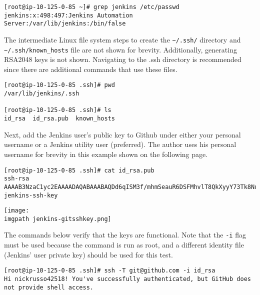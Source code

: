 \begin{verbatim}
[root@ip-10-125-0-85 ~]# grep jenkins /etc/passwd
jenkins:x:498:497:Jenkins Automation Server:/var/lib/jenkins:/bin/false
\end{verbatim}

The intermediate Linux file system steps to create the \verb|~/.ssh/|
directory and \verb|~/.ssh/known_hosts| file are not shown for brevity.
Additionally, generating RSA2048 keys is not shown.  Navigating to the .ssh
directory is recommended since there are additional commands that use these files.

\begin{verbatim}
[root@ip-10-125-0-85 .ssh]# pwd
/var/lib/jenkins/.ssh

[root@ip-10-125-0-85 .ssh]# ls
id_rsa  id_rsa.pub  known_hosts
\end{verbatim}

Next, add the Jenkins user's public key to Github under either your personal
username or a Jenkins utility user (preferred). The author uses his personal
username for brevity in this example shown on the following page.
 
\begin{verbatim}
[root@ip-10-125-0-85 .ssh]# cat id_rsa.pub
ssh-rsa AAAAB3NzaC1yc2EAAAADAQABAAABAQDd6qISM3f/mhmSeauR6DSFMhvlT8QkXyyY73Tk8Nuf+SytelhP15gqTao3iA08LlpOBOnvtGXVwHEyQhMu0JTfFwRsTOGRRl3Yp9n6Y2/8AGGNTp+Q4tGpczZkh/Xs7LFyQAK3DIVBBnfF0eOiX20/dC5W72aF3IzZBIsNyc9Bcka8wmVb2gdYkj1nQg6VQI1C6yayLwyjFxEDgArGbWk0Z4GbWqgfJno5gLT844SvWmOWEJ1jNIw1ipoxSioVSSc/rsA0A3e9nWZ/HQGUbbhIOGx7k4ruQLTCPeduU+VgIIj3Iws1tFRwc+lXEn58qicJ6nFlIbAW1kJj8I/+1fEj jenkins-ssh-key
\end{verbatim}

    \begin{minipage}[t]{\linewidth}
	  \centering
      \texttt{[image: \\imgpath jenkins-gitsshkey.png]}
    \end{minipage}

The commands below verify that the keys are functional. Note that the
\verb|-i| flag must be used because the command is run as root, and a
different identity file (Jenkins' user private key) should be used for this test.

\begin{verbatim}
[root@ip-10-125-0-85 .ssh]# ssh -T git@github.com -i id_rsa
Hi nickrusso42518! You've successfully authenticated, but GitHub does not provide shell access.
\end{verbatim}

